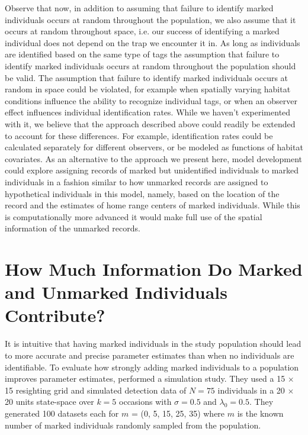 Observe that now, in addition to assuming that failure to identify
marked individuals occurs at random throughout the population, we also
assume that it occurs at random throughout space, i.e. our success of
identifying a marked individual does not depend on the trap we
encounter it in. As long as individuals are identified based on the same type of tags
the assumption that failure to identify marked individuals occurs at
random throughout the population should be valid. The assumption that
failure to identify marked individuals occurs at random in space could
be violated, for example when spatially varying habitat conditions
influence the ability to recognize individual tags, or when an
observer effect influences individual identification rates. While we
haven't experimented with it, we believe that the approach
described above could readily be extended to account for these
differences. For example, identification rates could be calculated
separately for different observers, or be modeled as functions of
habitat covariates. As an alternative to the approach we present here,
model development could explore assigning records of marked but
unidentified individuals to marked individuals in a fashion similar to
how unmarked records are assigned to hypothetical individuals in this
model, namely, based on the location of the record and the estimates
of home range centers of marked individuals. While this is
computationally more advanced it would make full use of the spatial
information of the unmarked records.


\section{How Much Information Do Marked and Unmarked Individuals Contribute?}
\label{partialID.sec.info}
It is intuitive that having marked individuals in the study population
should lead to more accurate and precise parameter estimates than when
no individuals are identifiable. To evaluate how strongly adding
marked individuals to a population improves parameter estimates,
\citet{chandler_royle:2012} performed a simulation study. They used a
15 $\times$ 15 resighting grid and simulated detection data of $N =
75$ individuals in a 20 $\times$ 20 units state-space over $k = 5$
occasions with $\sigma = 0.5$ and $\lambda_0 = 0.5$. They generated
100 datasets each for $m$ = (0, 5, 15, 25, 35) where $m$ is the known
number of marked individuals randomly sampled from the population.


